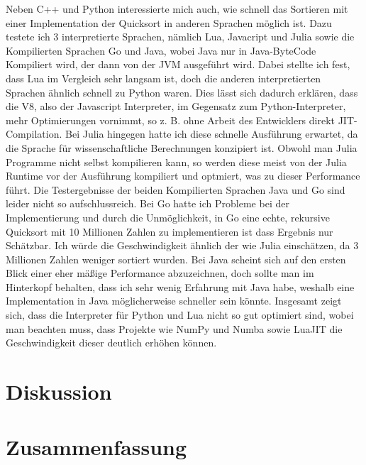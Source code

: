 \documentclass[12pt,a4paper]{article}
\begin{document}
Neben C++ und Python interessierte mich auch, wie schnell das Sortieren mit einer Implementation der Quicksort 
in anderen Sprachen möglich ist. Dazu testete ich 3 interpretierte Sprachen, nämlich Lua, Javacript und Julia sowie die
Kompilierten Sprachen Go und Java, wobei Java nur in Java-ByteCode Kompiliert wird, der dann von der JVM ausgeführt wird.
Dabei stellte ich fest, dass Lua im Vergleich sehr langsam ist, doch die anderen interpretierten Sprachen ähnlich schnell zu Python waren.
Dies lässt sich dadurch erklären, dass die V8, also der Javascript Interpreter, im Gegensatz zum Python-Interpreter,
mehr Optimierungen vornimmt, so z. B. ohne Arbeit des Entwicklers direkt JIT-Compilation. Bei Julia hingegen hatte ich diese
schnelle Ausführung erwartet, da die Sprache für wissenschaftliche Berechnungen konzipiert ist. Obwohl man Julia Programme nicht selbst kompilieren kann,
so werden diese meist von der Julia Runtime vor der Ausführung kompiliert und optmiert, was zu dieser Performance führt.
Die Testergebnisse der beiden Kompilierten Sprachen Java und Go sind leider nicht so aufschlussreich.
Bei Go hatte ich Probleme bei der Implementierung und durch die Unmöglichkeit, in Go eine echte, rekursive Quicksort mit 10 Millionen Zahlen
zu implementieren ist dass Ergebnis nur Schätzbar. Ich würde die Geschwindigkeit ähnlich der wie Julia einschätzen, da 3 Millionen Zahlen weniger sortiert wurden.
Bei Java scheint sich auf den ersten Blick einer eher mäßige Performance abzuzeichnen, doch sollte man im Hinterkopf behalten,
dass ich sehr wenig Erfahrung mit Java habe, weshalb eine Implementation in Java möglicherweise schneller sein könnte.
Insgesamt zeigt sich, dass die Interpreter für Python und Lua nicht so gut optimiert sind, wobei man beachten muss, dass Projekte wie NumPy und Numba sowie LuaJIT
die Geschwindigkeit dieser deutlich erhöhen können.

\clearpage
\section{Diskussion}
\clearpage
\section{Zusammenfassung}

\clearpage

\printbibliography[title={Literaturverzeichnis}]
\end{document}
